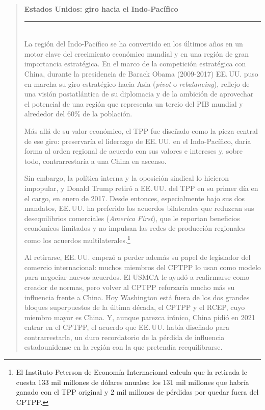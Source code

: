\documentclass[10pt,a4paper]{article}
\newenvironment{specialblock}[1]{%
      \begin{quote} %
      \small %
      \noindent\textbf{#1}\\[-0.3em] %
      \rule{\linewidth}{0.4pt}\\[0.6em]}{
      \end{quote}}
\begin{document}
\begin{specialblock}{Estados Unidos: giro hacia el Indo-Pacífico}
    La región del Indo-Pacífico se ha convertido en los últimos años en un motor clave del crecimiento económico mundial y en una región de gran importancia estratégica. En el marco de la competición estratégica con China, durante la presidencia de Barack Obama (2009-2017) EE.\,UU. puso en marcha su giro estratégico hacia Asia (\textit{pivot} o \textit{rebalancing}), reflejo de una visión postatlántica de su diplomacia y de la ambición de aprovechar el potencial de una región que representa un tercio del PIB mundial y alrededor del $60\%$ de la población.

    Más allá de su valor económico, el TPP fue diseñado como la pieza central de ese giro: preservaría el liderazgo de EE.\,UU. en el Indo-Pacífico, daría forma al orden regional de acuerdo con sus valores e intereses y, sobre todo, contrarrestaría a una China en ascenso. 
    
    Sin embargo, la política interna y la oposición sindical lo hicieron impopular, y Donald Trump retiró a EE.\,UU. del TPP en su primer día en el cargo, en enero de 2017. Desde entonces, especialmente bajo sus dos mandatos, EE.\,UU. ha preferido los acuerdos bilaterales que reduzcan sus desequilibrios comerciales (\textit{America First}), que le reportan beneficios económicos limitados y no impulsan las redes de producción regionales como los acuerdos multilaterales.\footnote{%
        El Instituto Peterson de Economía Internacional calcula que la retirada le cuesta $133$ mil millones de dólares anuales: los $131$ mil millones que habría ganado con el TPP original y $2$ mil millones de pérdidas por quedar fuera del CPTPP.
    }

    Al retirarse, EE.\,UU. empezó a perder además su papel de legislador del comercio internacional: muchos miembros del CPTPP lo usan como modelo para negociar nuevos acuerdos. El USMCA le ayudó a reafirmarse como creador de normas, pero volver al CPTPP reforzaría mucho más su influencia frente a China. Hoy Washington está fuera de los dos grandes bloques superpuestos de la última década, el CPTPP y el RCEP, cuyo miembro mayor es China. Y, aunque parezca irónico, China pidió en 2021 entrar en el CPTPP, el acuerdo que EE.\,UU. había diseñado para contrarrestarla, un duro recordatorio de la pérdida de influencia estadounidense en la región con la que pretendía reequilibrarse.


\end{specialblock}
\end{document}

